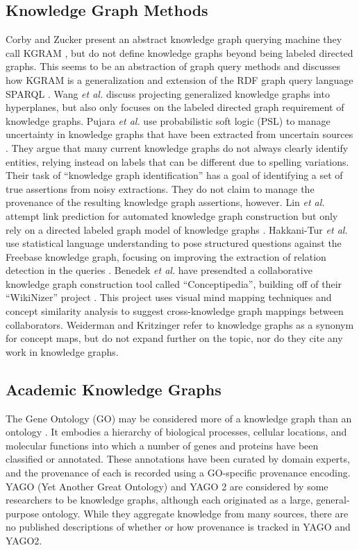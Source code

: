\subsection{Knowledge Graph Methods}
Corby and Zucker present an abstract knowledge graph querying machine they call KGRAM \cite{Corby_2010}, but do not define knowledge graphs beyond being labeled directed graphs.
This seems to be an abstraction of graph query methods and discusses how KGRAM is a generalization and extension of the RDF graph query language SPARQL \cite{harris2013sparql}.
Wang \emph{et al.} \cite{Wang_knowledgegraph} discuss projecting generalized knowledge graphs into hyperplanes, but also only focuses on the labeled directed graph requirement of knowledge graphs.
Pujara \emph{et al.} use probabilistic soft logic (PSL) to manage uncertainty in knowledge graphs that have been extracted from uncertain sources \cite{Pujara_2013}. 
They argue that many current knowledge graphs do not always clearly identify entities, relying instead on labels that can be different due to spelling variations.
Their task of ``knowledge graph identification'' has a goal of identifying a set of true assertions from noisy extractions.
They do not claim to manage the provenance of the resulting knowledge graph assertions, however.
Lin \emph{et al.} attempt link prediction for automated knowledge graph construction but only rely on a directed labeled graph model of knowledge graphs \cite{lin2015learning}.
Hakkani-Tur \emph{et al.} use statistical language understanding to pose structured questions against the Freebase knowledge graph, focusing on improving the extraction of relation detection in the queries \cite{Hakkani_Tur_2013}.
Benedek \emph{et al.} have presendted a collaborative knowledge graph construction tool called  ``Conceptipedia'', building off of their ``WikiNizer'' project .
This project uses visual mind mapping techniques and concept similarity analysis to suggest cross-knowledge graph mappings between collaborators.
Weiderman and Kritzinger \cite{} refer to knowledge graphs as a synonym for concept maps, but do not expand further on the topic, nor do they cite any work in knowledge graphs.
 

\subsection{Academic Knowledge Graphs}
The Gene Ontology (GO) may be considered more of a knowledge graph than an ontology \cite{Ashburner_2000}.
It embodies a hierarchy of biological processes, cellular locations, and molecular functions into which a number of genes and proteins have been classified or annotated.
These annotations have been curated by domain experts, and the provenance of each is recorded using a GO-specific provenance encoding.
YAGO (Yet Another Great Ontology) \cite{Suchanek_2007} and YAGO 2 \cite{Hoffart_2013} are considered by some researchers to be knowledge graphs, although each originated as a large, general-purpose ontology.
While they aggregate knowledge from many sources, there are no published descriptions of whether or how provenance is tracked in YAGO and YAGO2. 

